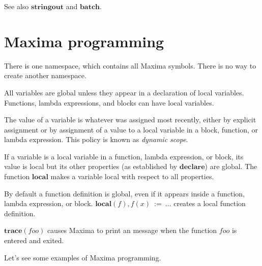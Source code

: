 \documentclass[12pt,leqno]{article}
\begin{document}
See also $\mathbf{stringout}$ and $\mathbf{batch}$.

\section{Maxima programming}


There is one namespace, which contains all Maxima symbols.
There is no way to create another namespace.

All variables are global unless they appear in a declaration of local variables.
Functions, lambda expressions, and blocks can have local variables.

The value of a variable is whatever was assigned most recently,
either by explicit assignment or by assignment of a value to a local variable
in a block, function, or lambda expression.
This policy is known as {\it dynamic scope}.

If a variable is a local variable in a function, lambda expression, or block,
its value is local but its other properties
(as established by $\mathbf{declare}$)
are global.
The function $\mathbf{local}$ makes a variable local with respect to all properties.

By default a function definition is global,
even if it appears inside a function, lambda expression, or block.
$\mathbf{local}(f), f(x) \mathbf{\ :=\ } \ldots$ creates a local function definition.

$\mathbf{trace}(\mathit{foo})$ causes Maxima to print an message when the function $\mathit{foo}$
is entered and exited.

Let's see some examples of Maxima programming.
\end{document}

